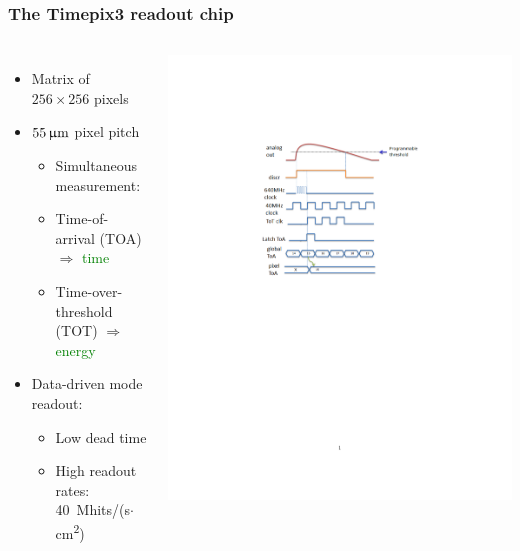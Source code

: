 \begin{frame}
  \frametitle{The Timepix3 readout chip}

  \begin{columns}
    \begin{itemize}
    \item Matrix of $256\times256$ pixels
    \item $55\,\upmu\mathrm{m}$ pixel pitch
      \begin{itemize}
      \item Simultaneous measurement:
      \item Time-of-arrival (TOA) $\Rightarrow$
        \textcolor{Green}{time}
        \item Time-over-threshold (TOT) $\Rightarrow$
          \textcolor{Green}{energy}
      \end{itemize}
    \item Data-driven mode readout:
      \begin{itemize}
      \item Low dead time
      \item High readout rates: 40~Mhits/(s$\cdot$cm\textsuperscript{2})
      \end{itemize}
    \end{itemize}

    \centering 
    \includegraphics[width=\textwidth, trim = 50mm 140mm
    60mm 50mm, clip]{../figures/Calibration/TOT_TOA_explanation.pdf}
  \end{columns}



\end{frame}
